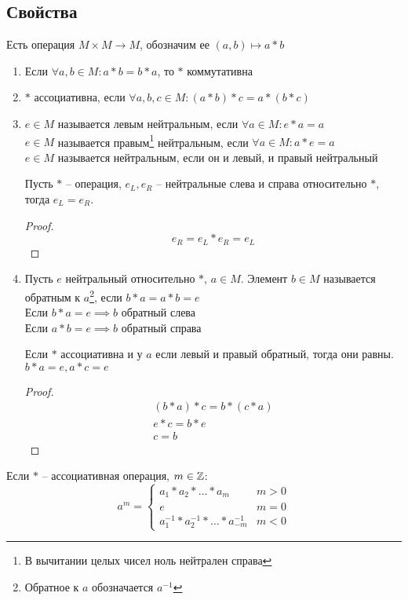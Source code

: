 \documentclass[main]{subfiles}
\begin{document}
\subsection{Свойства}
Есть операция $M \times M \to M$, обозначим ее $(a,b) \mapsto a*b$
\begin{enumerate}
    \item Если $\forall a,b \in M: a*b = b*a$, то $*$ коммутативна
    \item $*$ ассоциативна, если  $\forall a,b,c \in M: (a*b)*c = a*(b*c)$
    \item $e\in M$ называется левым нейтральным, если $\forall a \in M: e*a=a$\\
          $e\in M$ называется правым\footnote{В вычитании целых чисел ноль нейтрален справа} нейтральным, если $\forall a \in M: a*e=a$\\
          $e\in M$ называется нейтральным, если он и левый, и правый нейтральный
          \begin{lemma}
              Пусть $*$ -- операция, $e_L, e_R$ -- нейтральные слева
              и справа относительно $*$, тогда $e_L = e_R$.
          \end{lemma}
          \begin{proof}
              \[e_R = e_L * e_R = e_L\]
          \end{proof}
    \item Пусть $e$ нейтральный относительно $*$, $a\in M$. Элемент $b \in M$
          называется обратным к $a$\footnote{Обратное к $a$ обозначается $a^{-1}$}, если $b*a = a*b = e$\\
          Если $b*a = e \implies b$ обратный слева\\
          Если $a*b = e \implies b$ обратный справа
          \begin{lemma}
              Если $*$ ассоциативна и у $a$ если левый и правый обратный,
              тогда они равны. $b*a=e, a*c=e$
          \end{lemma}
          \begin{proof}
              \begin{gather*}
                  (b*a)*c=b*(c*a)\\
                  e*c =b*e\\
                  c=b
              \end{gather*}
          \end{proof}
\end{enumerate}

Если $*$ -- ассоциативная операция, $m \in \mathbb{Z}$:
\begin{equation*}
    a^m =
    \begin{cases}
        a_1 * a_2 * \ldots * a_m                  & m > 0 \\
        e                                         & m = 0 \\
        a_1^{-1}* a_2^{-1} * \ldots * a_{-m}^{-1} & m < 0
    \end{cases}
\end{equation*}
\end{document}
